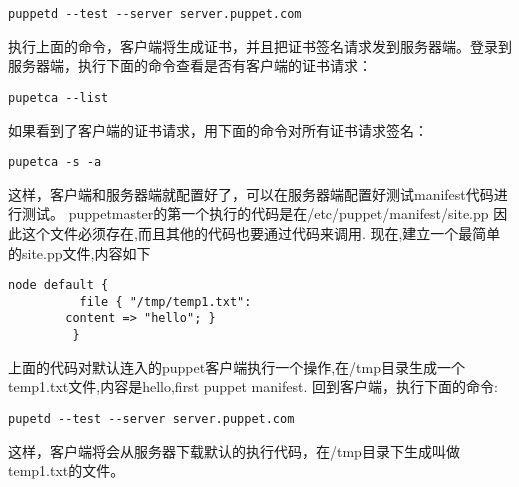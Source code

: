 \msyh
\begin{lstlisting}
puppetd --test --server server.puppet.com
\end{lstlisting}
\song
执行上面的命令，客户端将生成证书，并且把证书签名请求发到服务器端。登录到服务器端，执行下面的命令查看是否有客户端的证书请求：
\msyh \begin{lstlisting}
pupetca --list
\end{lstlisting} \song
如果看到了客户端的证书请求，用下面的命令对所有证书请求签名：
\msyh \begin{lstlisting}
pupetca -s -a
\end{lstlisting} \song
这样，客户端和服务器端就配置好了，可以在服务器端配置好测试manifest代码进行测试。
puppetmaster的第一个执行的代码是在/etc/puppet/manifest/site.pp
因此这个文件必须存在,而且其他的代码也要通过代码来调用.
现在,建立一个最简单的site.pp文件,内容如下
\msyh \begin{lstlisting}
node default {
          file { "/tmp/temp1.txt": 
		content => "hello"; }
         }
\end{lstlisting} \song
上面的代码对默认连入的puppet客户端执行一个操作,在/tmp目录生成一个temp1.txt文件,内容是hello,first puppet manifest.
回到客户端，执行下面的命令:
\msyh \begin{lstlisting}
pupetd --test --server server.puppet.com
\end{lstlisting} \song
这样，客户端将会从服务器下载默认的执行代码，在/tmp目录下生成叫做temp1.txt的文件。


